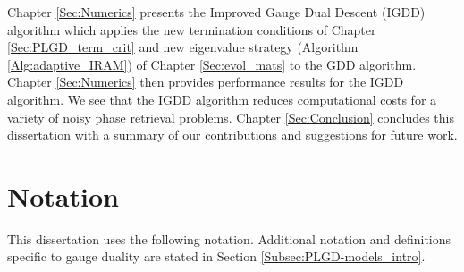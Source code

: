 Chapter \ref{Sec:Numerics} presents the Improved Gauge Dual Descent (IGDD) algorithm which applies the new termination conditions of Chapter \ref{Sec:PLGD_term_crit} and new eigenvalue strategy (Algorithm \ref{Alg:adaptive_IRAM}) of Chapter \ref{Sec:evol_mats} to the GDD algorithm.
Chapter \ref{Sec:Numerics} then provides performance results for the IGDD algorithm.
We see that the IGDD algorithm reduces computational costs for a variety of noisy phase retrieval problems.
Chapter \ref{Sec:Conclusion} concludes this dissertation with a summary of our contributions and suggestions for future work.






\section{Notation}		\label{Subsec:Intro-notation}


This dissertation uses the following notation.  Additional notation and definitions specific to gauge duality are stated in Section \ref{Subsec:PLGD-models_intro}.  

